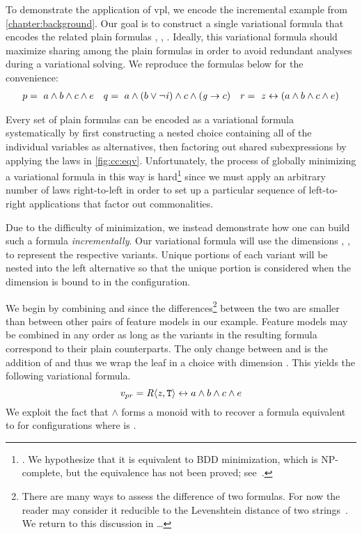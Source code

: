 %
To demonstrate the application of \ac{vpl}, we encode the incremental example
from \autoref{chapter:background}. Our goal is to construct a single variational
formula that encodes the related plain formulas \pV{}, \qV{}, \rV{}. Ideally,
this variational formula should maximize sharing among the plain formulas in
order to avoid redundant analyses during a variational solving. We reproduce the
formulas below for the convenience:
%
\begin{align*}
  p =\ a \wedge b \wedge c \wedge e && q=\ a \wedge (b \vee \neg \mathit{i}{}) \wedge c \wedge (\mathit{g}{} \rightarrow c) && r =~z \leftrightarrow (a \wedge b \wedge c \wedge e)
\end{align*}

%
Every set of plain formulas can be encoded as a variational formula
systematically by first constructing a nested choice containing all of the
individual variables as alternatives, then factoring out shared subexpressions
by applying the laws in \autoref{fig:cc:eqv}.
%
Unfortunately, the process of globally minimizing a variational formula in this
way is hard\footnote{\label{vpl:bdd}. We hypothesize that it is equivalent to
  BDD minimization, which is NP-complete, but the equivalence has not been
  proved; see~\cite{Walk14onward}.} since we must apply an arbitrary number of
laws right-to-left in order to set up a particular sequence of left-to-right
applications that factor out commonalities.

Due to the difficulty of minimization, we instead demonstrate how one can build
such a formula \emph{incrementally}.
%
Our variational formula will use the dimensions \dimP, \dimQ, \dimR{} to
represent the respective variants. Unique portions of each variant will be
nested into the left alternative so that the unique portion is considered when
the dimension is bound to \true in the configuration.

%
We begin by combining \pV{} and \rV{} since the differences\footnote{There are many ways to assess the difference of two
  formulas. For now the reader may consider it reducible to the Levenshtein
  distance of two strings~\cite{Levenshtein_SPD66}. We return to this discussion
  in \ldots{}} between the two are smaller than between other pairs of feature
models in our example. Feature models may be combined in any order as long as
the variants in the resulting formula correspond to their plain counterparts.
The only change between \pV{} and \rV{} is the addition of \zV{} and thus we
wrap the leaf in a choice with dimension \dimR. This yields the following
variational formula.
%
\begin{equation*}
  v_{pr} = \chc[\dimR]{\zV, \tru{}} \leftrightarrow a \wedge b \wedge c \wedge e
\end{equation*}
%
%
We exploit the fact that $\wedge$ forms a monoid with \tru{} to recover a
formula equivalent to \pV{} for configurations where \dimR{} is \false.

